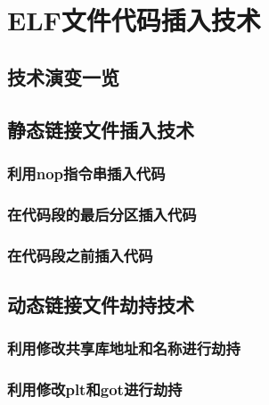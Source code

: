 
\chapter{ELF文件代码插入技术}

\section{技术演变一览}

\section{静态链接文件插入技术}

\subsection{利用nop指令串插入代码}

\subsection{在代码段的最后分区插入代码}

\subsection{在代码段之前插入代码}

\section{动态链接文件劫持技术}

\subsection{利用修改共享库地址和名称进行劫持}

\subsection{利用修改plt和got进行劫持}


